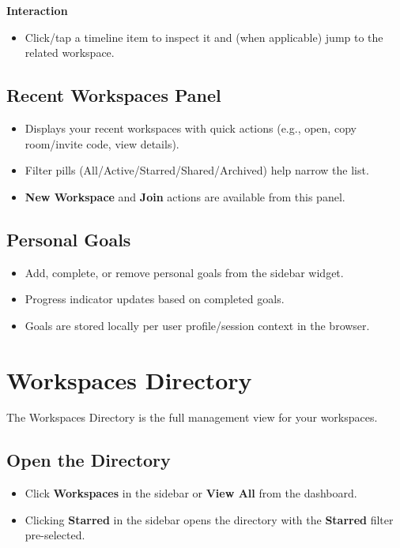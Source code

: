 \documentclass[11pt,a4paper]{article}
\begin{document}
\textbf{Interaction}
\begin{itemize}
  \item Click/tap a timeline item to inspect it and (when applicable) jump to the related workspace.
\end{itemize}

\subsection{Recent Workspaces Panel}
\begin{itemize}
  \item Displays your recent workspaces with quick actions (e.g., open, copy room/invite code, view details).
  \item Filter pills (All/Active/Starred/Shared/Archived) help narrow the list.
  \item \textbf{New Workspace} and \textbf{Join} actions are available from this panel.
\end{itemize}

\subsection{Personal Goals}
\begin{itemize}
  \item Add, complete, or remove personal goals from the sidebar widget.
  \item Progress indicator updates based on completed goals.
  \item Goals are stored locally per user profile/session context in the browser.
\end{itemize}

\section{Workspaces Directory}

The Workspaces Directory is the full management view for your workspaces.

\subsection{Open the Directory}
\begin{itemize}
  \item Click \textbf{Workspaces} in the sidebar or \textbf{View All} from the dashboard.
  \item Clicking \textbf{Starred} in the sidebar opens the directory with the \textbf{Starred} filter pre-selected.
\end{itemize}
\end{document}

